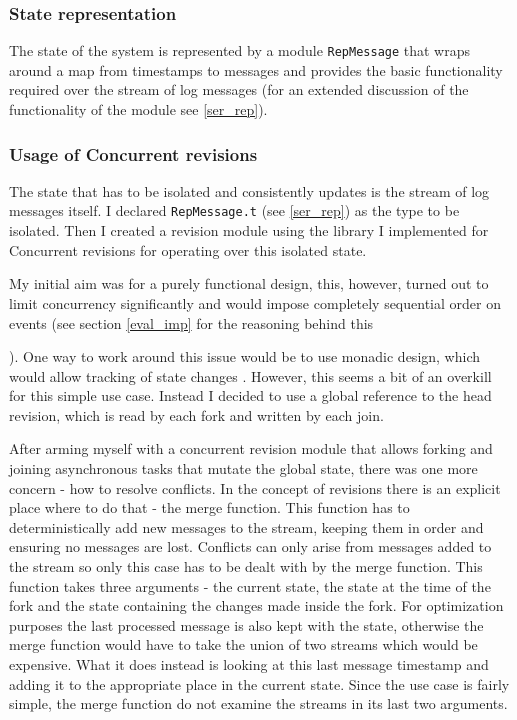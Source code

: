 \documentclass[12pt,twoside,notitlepage]{report}
\begin{document}
{{\subsubsection{State representation}
The state of the system is represented by a module {\tt RepMessage} that wraps around a map from timestamps to messages and provides the basic functionality required over the stream of log messages (for an extended discussion of the functionality of the module see \ref{ser_rep}). 

\subsubsection{Usage of Concurrent revisions}
\label{log_usage}
The state that has to be isolated and consistently updates is the stream of log messages itself. I declared {\tt RepMessage.t} (see \ref{ser_rep}) as the type to be isolated. Then I created a revision module using the library I implemented for Concurrent revisions for operating over this isolated state. 

My initial aim was for a purely functional design, this, however, turned out to limit concurrency significantly and would impose completely sequential order on events (see section \ref{eval_imp} for the reasoning behind this}). One way to work around this issue would be to use monadic design, which would allow tracking of state changes \cite{haskell}. However, this seems a bit of an overkill for this simple use case. Instead I decided to use a global reference to the head revision, which is read by each fork and written by each join.

After arming myself with a concurrent revision module that allows forking and joining asynchronous tasks that mutate the global state, there was one more concern - how to resolve conflicts. In the concept of revisions there is an explicit place where to do that - the merge function. This function has to deterministically add new messages to the stream, keeping them in order and ensuring no messages are lost. Conflicts can only arise from messages added to the stream so only this case has to be dealt with by the merge function. This function takes three arguments - the current state, the state at the time of the fork and the state containing the changes made inside the fork. For optimization purposes the last processed message is also kept with the state, otherwise the merge function would have to take the union of two streams which would be expensive. What it does instead is looking at this last message timestamp and adding it to the appropriate place in the current state. Since the use case is fairly simple, the merge function do not examine the streams in its last two arguments.

}
\end{document}
